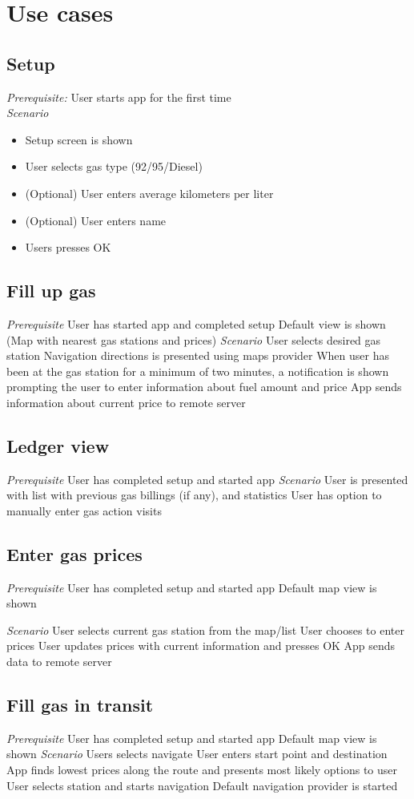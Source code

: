 
\chapter{Use cases}

\section{Setup}
\emph{Prerequisite:} User starts app for the first time\\
\emph{Scenario}
\begin{itemize}
\item Setup screen is shown
\item User selects gas type (92/95/Diesel)
\item (Optional) User enters average kilometers per liter
\item (Optional) User enters name
\item Users presses OK
\end{itemize}

\section{Fill up gas}
\emph{Prerequisite}
User has started app and completed setup
Default view is shown (Map with nearest gas stations and prices)
\emph{Scenario}
User selects desired gas station
Navigation  directions is presented using maps provider
When user has been at the gas station for a minimum of two minutes, a notification is shown prompting the user to enter information about fuel amount and price
App sends information about current price to remote server

\section{Ledger view}
\emph{Prerequisite}
User has completed setup and started app
\emph{Scenario}
User is presented with list with previous gas billings (if any), and statistics
User has option to manually enter gas action visits

\section{Enter gas prices}
\emph{Prerequisite}
User has completed setup and started app
Default map view is shown

\emph{Scenario}
User selects current gas station from the map/list
User chooses to enter prices
User updates prices with current information and presses OK
App sends data to remote server

\section{Fill gas in transit}
\emph{Prerequisite}
User has completed setup and started app
Default map view is shown
\emph{Scenario}
Users selects navigate
User enters start point and destination
App finds lowest prices along the route and presents most likely options to user
User selects station and starts navigation
Default navigation provider is started


